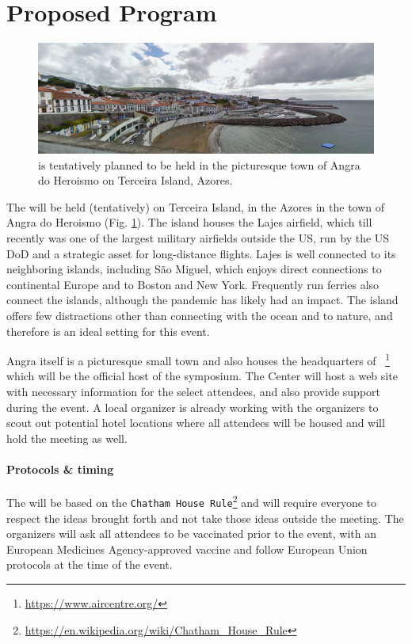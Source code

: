 \section{Proposed Program}
\label{sec:pgm}

\begin{figure}[!h]
  \centering
  \includegraphics[scale=0.5]{fig/angra.png}
  \caption{\symp is tentatively planned to be held in the picturesque
    town of Angra do Heroismo on Terceira Island, Azores.}
  \label{fig:angra}
\end{figure}

The \symp will be held (tentatively) on Terceira Island, in the Azores
in the town of Angra do Heroismo (Fig. \ref{fig:angra}). The island
houses the Lajes airfield, which till recently was one of the largest
military airfields outside the US, run by the US DoD and a strategic
asset for long-distance flights. Lajes is well connected to its
neighboring islands, including S\~{a}o Miguel, which enjoys direct
connections to continental Europe and to Boston and New
York. Frequently run ferries also connect the islands, although the
pandemic has likely had an impact. The island offers few distractions
other than connecting with the ocean and to nature, and therefore is
an ideal setting for this event.

Angra itself is a picturesque small town and also houses the
headquarters of \aire~\footnote{\url{https://www.aircentre.org/}} which
will be the official host of the symposium. The Center will host a web
site with necessary information for the select attendees, and also
provide support during the event. A local organizer is already working
with the organizers to scout out potential hotel locations where all
attendees will be housed and will hold the meeting as well. 

\paragraph{Protocols \& timing} The \symp will be based on the
\texttt{Chatham House
  Rule}\footnote{\url{https://en.wikipedia.org/wiki/Chatham_House_Rule}}
and will require everyone to respect the ideas brought forth and not
take those ideas outside the meeting.  The organizers will ask all
attendees to be vaccinated prior to the event, with an European
Medicines Agency-approved vaccine and follow European Union protocols
at the time of the event.

